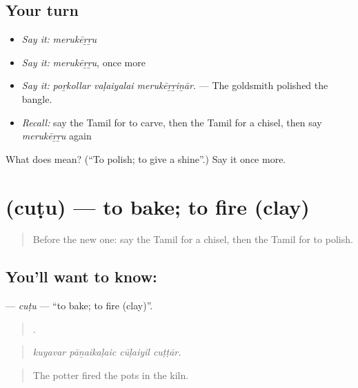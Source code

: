 \subsection*{Your turn}
\begin{itemize}
\raggedright
  \item \emph{Say it:} \emph{merukēṟṟu}
  \item \emph{Say it:} \emph{merukēṟṟu}, once more
  \item \emph{Say it:} \emph{poṟkollar vaḷaiyalai merukēṟṟiṉār.} — The goldsmith polished the bangle.
  \item \emph{Recall:} say the Tamil for to carve, then the Tamil for a chisel, then say \emph{merukēṟṟu} again
\end{itemize}

\begin{tcolorbox}[breakable,colback=teal!4,colframe=teal!35!black,title={Before you move on}]
What does  mean? (\textquotedblleft{}To polish; to give a shine\textquotedblright{}.) Say it once more.
\end{tcolorbox}
\section[\texorpdfstring{\ta{சுடு} (cuṭu)}{சுடு (cuṭu)}]{ (cuṭu) — to bake; to fire (clay)}

\label{lesson:TA-C537-cutu}



\begin{quote}
Before the new one: say the Tamil for a chisel, then the Tamil for to polish.
\end{quote}

\subsection*{You'll want to know: }
\textbf{} — \emph{cuṭu} — \textquotedblleft{}to bake; to fire (clay)\textquotedblright{}.

\begin{quote}
   .
\end{quote}

\begin{quote}
\emph{kuyavar pāṉaikaḷaic cūḷaiyil cuṭṭār.}
\end{quote}

\begin{quote}
The potter fired the pots in the kiln.
\end{quote}

